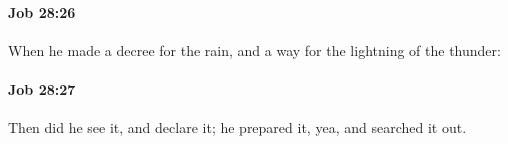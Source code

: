 		\paragraph{Job 28:26} %
			\label{JOB-28-26}

			When he made a decree for the rain, and a way for the lightning of the thunder:


		\paragraph{Job 28:27} %
			\label{JOB-28-27}

			Then did he see it, and declare it; he prepared it, yea, and searched it out.


